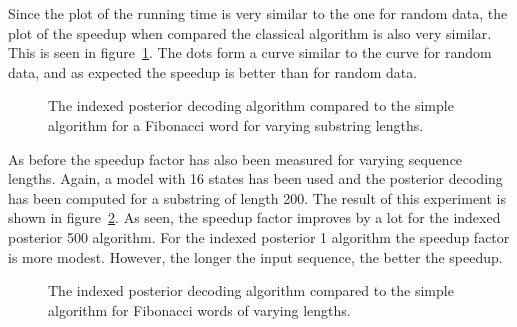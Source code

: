 Since the plot of the running time is very similar to the one for random data,
the plot of the speedup when compared the classical algorithm is also very
similar. This is seen in
figure~\ref{fig:fib_indexed_posterior_speedup_vs_subseq}. The dots form a
curve similar to the curve for random data, and as expected the speedup is
better than for random data.

\begin{figure}
  \centering
  
  \caption{The indexed posterior decoding algorithm compared to the simple
    algorithm for a Fibonacci word for varying substring lengths.}
  \label{fig:fib_indexed_posterior_speedup_vs_subseq}
\end{figure}

As before the speedup factor has also been measured for varying sequence
lengths. Again, a model with 16 states has been used and the posterior decoding
has been computed for a substring of length 200. The result of this experiment
is shown in figure~\ref{fig:indexed_posterior_fib_speedup_vs_T}. As seen, the
speedup factor improves by a lot for the indexed posterior 500 algorithm. For
the indexed posterior 1 algorithm the speedup factor is more modest. However,
the longer the input sequence, the better the speedup.

\begin{figure}
  \centering
  
  \caption{The indexed posterior decoding algorithm compared to the simple
    algorithm for Fibonacci words of varying lengths.}
  \label{fig:indexed_posterior_fib_speedup_vs_T}
\end{figure}

